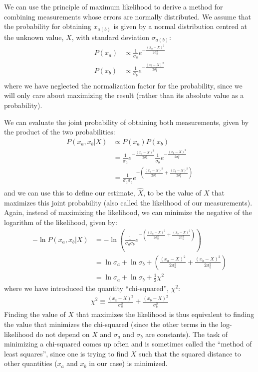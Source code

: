 We can use the principle of maximum likelihood to derive a method for combining measurements whose errors are normally distributed. We assume that the probability for obtaining $x_{a(b)}$ is given by a normal distribution centred at the unknown value, $X$, with standard deviation $\sigma_{a(b)}$:
\begin{align}
P(x_a)&\propto \frac{1}{\sigma_a}e^{-\frac{(x_a-X)^2}{2\sigma_a^2}}\nonumber\\
P(x_b)&\propto \frac{1}{\sigma_b}e^{-\frac{(x_b-X)^2}{2\sigma_b^2}}\nonumber\\
\end{align} 
where we have neglected the normalization factor for the probability, since we will only care about maximizing the result (rather than its absolute value as a probability). 

We can evaluate the joint probability of obtaining both measurements, given by the product of the two probabilities:
\begin{align}
P(x_a,x_b|X)&\propto P(x_a) P(x_b) \nonumber\\
&=\frac{1}{\sigma_a}e^{-\frac{(x_a-X)^2}{2\sigma_a^2}}\frac{1}{\sigma_b}e^{-\frac{(x_b-X)^2}{2\sigma_b^2}}\nonumber\\
&=\frac{1}{\sigma_a\sigma_b}e^{-\left(\frac{(x_a-X)^2}{2\sigma_a^2}+\frac{(x_b-X)^2}{2\sigma_b^2}\right)}\nonumber\\
\end{align}
and we can use this to define our estimate, $\hat X$, to be the value of $X$ that maximizes this joint probability (also called the likelihood of our measurements). Again, instead of maximizing the likelihood, we can minimize the negative of the logarithm of the likelihood, given by:
\begin{align}
-\ln{P(x_a,x_b|X)}&=-\ln\left(\frac{1}{\sigma_a\sigma_b}e^{-\left(\frac{(x_a-X)^2}{2\sigma_a^2}+\frac{(x_b-X)^2}{2\sigma_b^2}\right)}\right)\nonumber\\
&=\ln{\sigma_a}+\ln{\sigma_b}+\left(\frac{(x_a-X)^2}{2\sigma_a^2}+\frac{(x_b-X)^2}{2\sigma_b^2}\right)\nonumber\\
&=\ln{\sigma_a}+\ln{\sigma_b}+\frac{1}{2}\chi^2
\end{align} 
where we have introduced the quantity ``chi-squared'', $\chi^2$:
\begin{align}
\chi^2\equiv \frac{(x_a-X)^2}{\sigma_a^2}+\frac{(x_b-X)^2}{\sigma_b^2}
\end{align}
Finding the value of $X$ that maximizes the likelihood is thus equivalent to finding the value that minimizes the chi-squared (since the other terms in the log-likelihood do not depend on $X$ and $\sigma_a$ and $\sigma_b$ are constants). The task of minimizing a chi-squared comes up often and is sometimes called the ``method of least squares'', since one is trying to find $X$ such that the squared distance to other quantities ($x_a$ and $x_b$ in our case) is minimized. 

